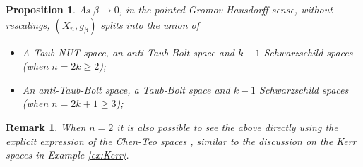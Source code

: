 \documentclass[a4paper,11pt]{amsart}
\newtheorem{proposition}[theorem]{Proposition}
\newtheorem{remark}[theorem]{Remark}
\theoremstyle{definition}
\numberwithin{equation}{section}
\begin{document}
\begin{proposition}
   As $\beta\rightarrow 0$, in the pointed Gromov-Hausdorff sense, without rescalings, $(X_{n}, g_\beta)$ splits into the union of 
   \begin{itemize}
       \item A  Taub-NUT space, an anti-Taub-Bolt space and $k-1$ Schwarzschild spaces (when $n=2k\geq 2$);
       \item An anti-Taub-Bolt space, a  Taub-Bolt space and $k-1$ Schwarzschild spaces (when $n=2k+1\geq3$);
   \end{itemize}
\end{proposition}
\begin{remark}
    When $n=2$ it is also possible to see the above directly using the explicit expression of the Chen-Teo spaces \cite{Chen-Teo}, similar to the discussion on the Kerr spaces in Example \ref{ex:Kerr}.
\end{remark}
\end{document}

